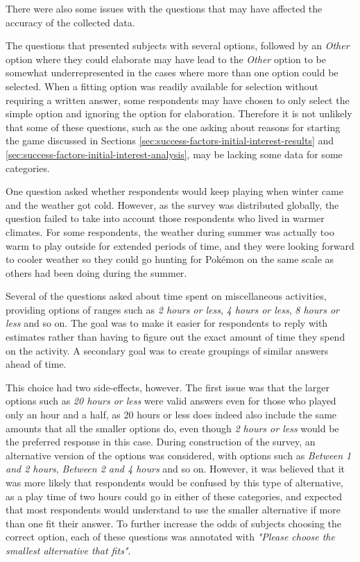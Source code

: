 There were also some issues with the questions that may have affected the accuracy of the collected data.

The questions that presented subjects with several options, followed by an \emph{Other} option where they could elaborate may have lead to the \emph{Other} option to be somewhat underrepresented in the cases where more than one option could be selected. When a fitting option was readily available for selection without requiring a written answer, some respondents may have chosen to only select the simple option and ignoring the option for elaboration. Therefore it is not unlikely that some of these questions, such as the one asking about reasons for starting the game discussed in Sections \ref{sec:success-factors-initial-interest-results} and \ref{sec:success-factors-initial-interest-analysis}, may be lacking some data for some categories.

One question asked whether respondents would keep playing when winter came and the weather got cold. However, as the survey was distributed globally, the question failed to take into account those respondents who lived in warmer climates. For some respondents, the weather during summer was actually too warm to play outside for extended periods of time, and they were looking forward to cooler weather so they could go hunting for Pokémon on the same scale as others had been doing during the summer.

Several of the questions asked about time spent on miscellaneous activities, providing options of ranges such as \emph{2 hours or less}, \emph{4 hours or less}, \emph{8 hours or less} and so on. The goal was to make it easier for respondents to reply with estimates rather than having to figure out the exact amount of time they spend on the activity. A secondary goal was to create groupings of similar answers ahead of time.

This choice had two side-effects, however. The first issue was that the larger options such as \emph{20 hours or less} were valid answers even for those who played only an hour and a half, as 20 hours or less does indeed also include the same amounts that all the smaller options do, even though \emph{2 hours or less} would be the preferred response in this case. During construction of the survey, an alternative version of the options was considered, with options such as \emph{Between 1 and 2 hours}, \emph{Between 2 and 4 hours} and so on. However, it was believed that it was more likely that respondents would be confused by this type of alternative, as a play time of two hours could go in either of these categories, and expected that most respondents would understand to use the smaller alternative if more than one fit their answer. To further increase the odds of subjects choosing the correct option, each of these questions was annotated with \emph{"Please choose the smallest alternative that fits"}.

